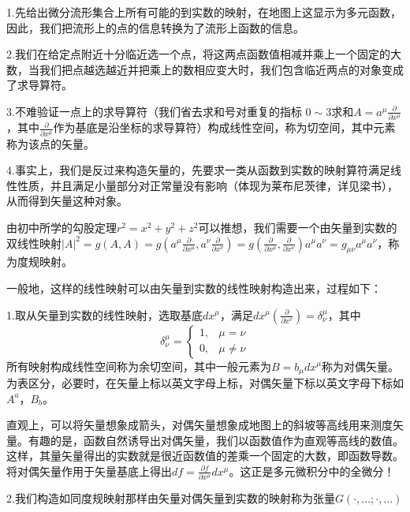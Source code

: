\documentclass{article}
\begin{document}
1.先给出微分流形集合上所有可能的到实数的映射，在地图上这显示为多元函数，因此，我们把流形上的点的信息转换为了流形上函数的信息。

2.我们在给定点附近十分临近选一个点，将这两点函数值相减并乘上一个固定的大数，当我们把点越选越近并把乘上的数相应变大时，我们包含临近两点的对象变成了求导算符。

3.不难验证一点上的求导算符（我们省去求和号对重复的指标 $ 0 \sim 3 $求和$A=a^\mu \frac{\partial}{\partial x^\mu }$，其中$\frac{\partial}{\partial x^\mu }$作为基底是沿坐标的求导算符）构成线性空间，称为切空间，其中元素称为该点的矢量。

4.事实上，我们是反过来构造矢量的，先要求一类从函数到实数的映射算符满足线性性质，并且满足小量部分对正常量没有影响（体现为莱布尼茨律，详见梁书），从而得到矢量这种对象。

由初中所学的勾股定理$r^2=x^2+y^2+z^2$可以推想，我们需要一个由矢量到实数的双线性映射$|A|^2=g(A,A)=g(a^\mu \frac{\partial}{\partial x^\mu },a^\nu \frac{\partial}{\partial x^\nu })=g( \frac{\partial}{\partial x^\mu }, \frac{\partial}{\partial x^\nu})a^\mu a^\nu=g_{\mu \nu }a^\mu a^\nu $，称为度规映射。

一般地，这样的线性映射可以由矢量到实数的线性映射构造出来，过程如下：

1.取从矢量到实数的线性映射，选取基底$dx^\mu $，满足$dx^\mu (\frac{\partial}{\partial x^\nu })=\delta ^\mu _\nu$，其中
\begin{equation*}
    \delta ^\mu _\nu =
    \begin{cases}
    1,&\mu=\nu
    \\0,&\mu\neq \nu
\end{cases}
\end{equation*}
所有映射构成线性空间称为余切空间，其中一般元素为$B=b_\mu dx^\mu $称为对偶矢量。为表区分，必要时，在矢量上标以英文字母上标，对偶矢量下标以英文字母下标如$A^a$，$B_b$。

直观上，可以将矢量想象成箭头，对偶矢量想象成地图上的斜坡等高线用来测度矢量。有趣的是，函数自然诱导出对偶矢量，我们以函数值作为直观等高线的数值。这样，其量矢量得出的实数就是很近函数值的差乘一个固定的大数，即函数导数。将对偶矢量作用于矢量基底上得出$df=\frac{\partial f}{\partial x^\mu }dx^\mu $。这正是多元微积分中的全微分！

2.我们构造如同度规映射那样由矢量对偶矢量到实数的映射称为张量$G(\cdot,\dots;\cdot,\dots)$
\end{document}
